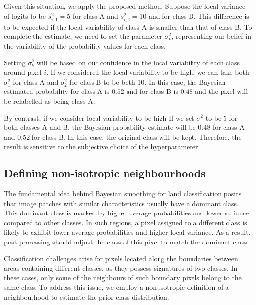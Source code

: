 \documentclass[
  shortnames]{jss}
\begin{document}
Given this situation, we apply the proposed method. Suppose the local variance of logits to be \(s^2_{i,1} = 5\) for class A and \(s^2_{i,2} = 10\) and for class B. This difference is to be expected if the local variability of class A is smaller than that of class B. To complete the estimate, we need to set the parameter \(\sigma^2_{k}\), representing our belief in the variability of the probability values for each class.

Setting \(\sigma^2_{k}\) will be based on our confidence in the local variability of each class around pixel \({i}\). If we considered the local variability to be high, we can take both \(\sigma^2_1\) for class A and \(\sigma^2_2\) for class B to be both 10. In this case, the Bayesian estimated probability for class A is \(0.52\) and for class B is \(0.48\) and the pixel will be relabelled as being class A.

By contrast, if we consider local variability to be high If we set \(\sigma^2\) to be 5 for both classes A and B, the Bayesian probability estimate will be \(0.48\) for class A and \(0.52\) for class B. In this case, the original class will be kept. Therefore, the result is sensitive to the subjective choice of the hyperparameter.

\newpage

\hypertarget{defining-non-isotropic-neighbourhoods}{%
\subsection{Defining non-isotropic neighbourhoods}\label{defining-non-isotropic-neighbourhoods}}

The fundamental idea behind Bayesian smoothing for land classification posits that image patches with similar characteristics usually have a dominant class. This dominant class is marked by higher average probabilities and lower variance compared to other classes. In such regions, a pixel assigned to a different class is likely to exhibit lower average probabilities and higher local variance. As a result, post-processing should adjust the class of this pixel to match the dominant class.

Classification challenges arise for pixels located along the boundaries between areas containing different classes, as they possess signatures of two classes. In these cases, only some of the neighbours of such boundary pixels belong to the same class. To address this issue, we employ a non-isotropic definition of a neighbourhood to estimate the prior class distribution.
\end{document}
